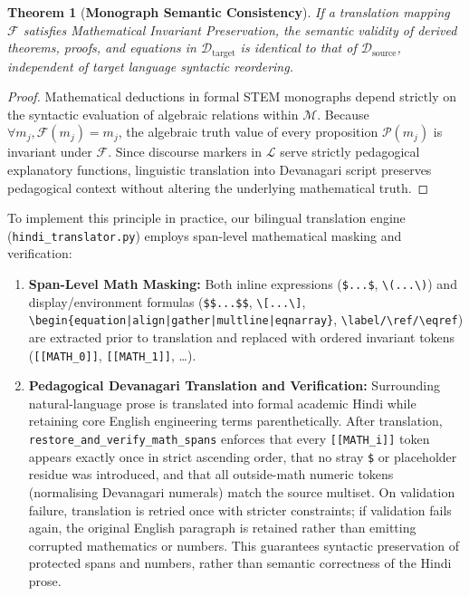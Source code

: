 \documentclass[11pt,a4paper,oneside]{report}
\newtheorem{theorem}{Theorem}[chapter]
\begin{document}
\begin{theorem}[\textbf{Monograph Semantic Consistency}]
\label{thm:semantic_consistency}
If a translation mapping $\mathcal{F}$ satisfies Mathematical Invariant Preservation, the semantic validity of derived theorems, proofs, and equations in $\mathcal{D}_{\text{target}}$ is identical to that of $\mathcal{D}_{\text{source}}$, independent of target language syntactic reordering.
\end{theorem}

\begin{proof}
Mathematical deductions in formal STEM monographs depend strictly on the syntactic evaluation of algebraic relations within $\mathcal{M}$. Because $\forall m_j, \mathcal{F}(m_j) = m_j$, the algebraic truth value of every proposition $\mathcal{P}(m_j)$ is invariant under $\mathcal{F}$. Since discourse markers in $\mathcal{L}$ serve strictly pedagogical explanatory functions, linguistic translation into Devanagari script preserves pedagogical context without altering the underlying mathematical truth.
\end{proof}

To implement this principle in practice, our bilingual translation engine (\texttt{hindi\_translator.py}) employs span-level mathematical masking and verification:
\begin{enumerate}[noitemsep]
    \item \textbf{Span-Level Math Masking:} Both inline expressions (\texttt{\$...\$}, \texttt{\textbackslash(...\textbackslash)}) and display/environment formulas (\texttt{\$\$...\$\$}, \texttt{\textbackslash[...\textbackslash]}, \texttt{\textbackslash begin\{equation|align|gather|multline|eqnarray\}}, \texttt{\textbackslash label/\textbackslash ref/\textbackslash eqref}) are extracted prior to translation and replaced with ordered invariant tokens (\texttt{[[MATH\_0]]}, \texttt{[[MATH\_1]]}, \dots).
    \item \textbf{Pedagogical Devanagari Translation and Verification:} Surrounding natural-language prose is translated into formal academic Hindi while retaining core English engineering terms parenthetically. After translation, \texttt{restore\_and\_verify\_math\_spans} enforces that every \texttt{[[MATH\_i]]} token appears exactly once in strict ascending order, that no stray \texttt{\$} or placeholder residue was introduced, and that all outside-math numeric tokens (normalising Devanagari numerals) match the source multiset. On validation failure, translation is retried once with stricter constraints; if validation fails again, the original English paragraph is retained rather than emitting corrupted mathematics or numbers. This guarantees syntactic preservation of protected spans and numbers, rather than semantic correctness of the Hindi prose.
\end{enumerate}
\end{document}
